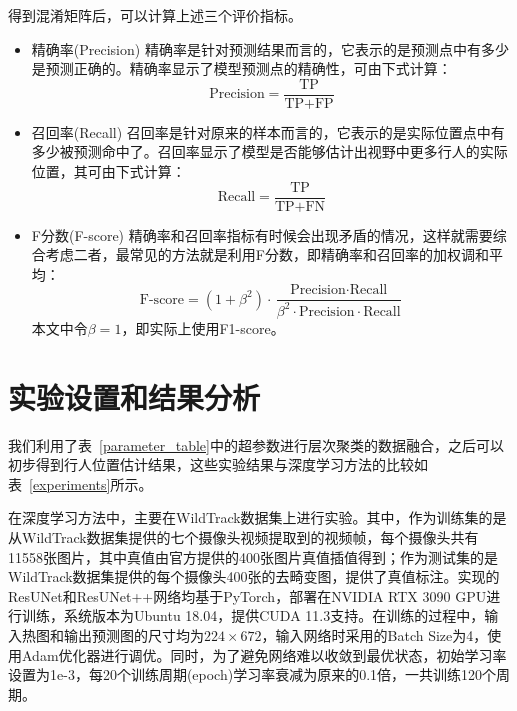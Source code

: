 得到混淆矩阵后，可以计算上述三个评价指标。
\begin{itemize}
    \item 精确率(Precision) 精确率是针对预测结果而言的，它表示的是预测点中有多少是预测正确的。精确率显示了模型预测点的精确性，可由下式计算：
        \begin{equation}
            \text{Precision}=\frac{\text{TP}}{\text{TP}+\text{FP}}
        \end{equation}
    \item 召回率(Recall) 召回率是针对原来的样本而言的，它表示的是实际位置点中有多少被预测命中了。召回率显示了模型是否能够估计出视野中更多行人的实际位置，其可由下式计算：
    \begin{equation}
        \text{Recall}=\frac{\text{TP}}{\text{TP}+\text{FN}}
    \end{equation}
    \item F分数(F-score) 精确率和召回率指标有时候会出现矛盾的情况，这样就需要综合考虑二者，最常见的方法就是利用F分数，即精确率和召回率的加权调和平均：
    \begin{equation}
        \text{F-score}=(1+\beta^2)\cdot \frac{\text{Precision} \cdot \text{Recall}}{\beta^2 \cdot \text{Precision} \cdot \text{Recall}}
    \end{equation}
    本文中令$\beta=1$，即实际上使用F1-score。
\end{itemize}

\section{实验设置和结果分析}

我们利用了表~\ref{parameter_table}中的超参数进行层次聚类的数据融合，之后可以初步得到行人位置估计结果，这些实验结果与深度学习方法的比较如表~\ref{experiments}所示。

在深度学习方法中，主要在WildTrack数据集上进行实验。其中，作为训练集的是从WildTrack数据集提供的七个摄像头视频提取到的视频帧，每个摄像头共有11558张图片，其中真值由官方提供的400张图片真值插值得到；作为测试集的是WildTrack数据集提供的每个摄像头400张的去畸变图，提供了真值标注。实现的ResUNet和ResUNet++网络均基于PyTorch，部署在NVIDIA RTX 3090 GPU进行训练，系统版本为Ubuntu 18.04，提供CUDA 11.3支持。在训练的过程中，输入热图和输出预测图的尺寸均为$224\times 672$，输入网络时采用的Batch Size为4，使用Adam优化器进行调优。同时，为了避免网络难以收敛到最优状态，初始学习率设置为1e-3，每20个训练周期(epoch)学习率衰减为原来的0.1倍，一共训练120个周期。


